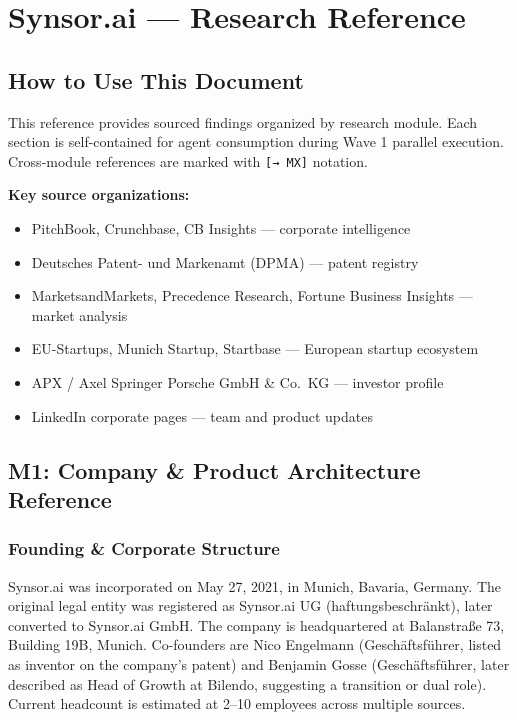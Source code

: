 \documentclass[11pt,letterpaper]{article}
\newcommand{\stageheader}[2]{%
  \noindent\colorbox{#2}{\makebox[\textwidth][l]{%
    \textcolor{white}{\bfseries\sffamily\hspace{6pt}#1\hspace{6pt}}}}%
  \vspace{0.5em}\par%
}
\begin{document}
\newpage
\stageheader{STAGE 2 --- RESEARCH REFERENCE}{secondary}

\section{Synsor.ai --- Research Reference}

\subsection{How to Use This Document}

This reference provides sourced findings organized by research module. Each section is self-contained for agent consumption during Wave 1 parallel execution. Cross-module references are marked with \texttt{[→ MX]} notation.

\textbf{Key source organizations:}
\begin{itemize}[leftmargin=2em]
  \item PitchBook, Crunchbase, CB Insights --- corporate intelligence
  \item Deutsches Patent- und Markenamt (DPMA) --- patent registry
  \item MarketsandMarkets, Precedence Research, Fortune Business Insights --- market analysis
  \item EU-Startups, Munich Startup, Startbase --- European startup ecosystem
  \item APX / Axel Springer Porsche GmbH \& Co.\ KG --- investor profile
  \item LinkedIn corporate pages --- team and product updates
\end{itemize}

\subsection{M1: Company \& Product Architecture Reference}

\subsubsection{Founding \& Corporate Structure}

Synsor.ai was incorporated on May 27, 2021, in Munich, Bavaria, Germany. The original legal entity was registered as Synsor.ai UG (haftungsbeschr\"{a}nkt), later converted to Synsor.ai GmbH. The company is headquartered at Balanstra\ss e 73, Building 19B, Munich. Co-founders are Nico Engelmann (Gesch\"{a}ftsf\"{u}hrer, listed as inventor on the company's patent) and Benjamin Gosse (Gesch\"{a}ftsf\"{u}hrer, later described as Head of Growth at Bilendo, suggesting a transition or dual role). Current headcount is estimated at 2--10 employees across multiple sources.
\end{document}
